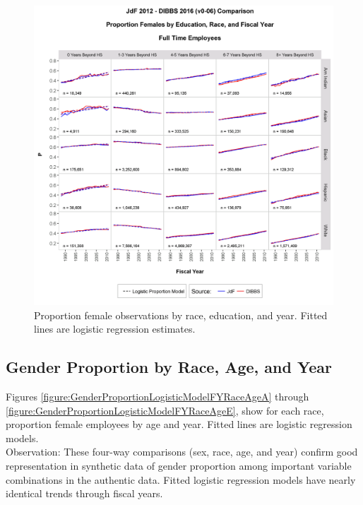 \documentclass[10pt, letterpaper]{article}
\begin{document}
\begin{spacing}{1.0}
\begin{figure}[h]
    \centering
    \includegraphics[width=6.25in, trim={0 0 0 1in}, clip]{GenderProportionLogisticModelEducationRaceFYScaleFixedv0-06.png}
    \caption{Proportion female observations by race, education, and year.  Fitted lines are logistic regression estimates.}
    \label{figure:GenderProportionLogisticModelEducationRaceFYScaleFixedv0-06}
\end{figure}

\clearpage

\subsection{Gender Proportion by Race, Age, and Year}

Figures \ref{figure:GenderProportionLogisticModelFYRaceAgeA} through \ref{figure:GenderProportionLogisticModelFYRaceAgeE}, show for each race, proportion female employees by age and year.  Fitted lines are logistic regression models.\\

Observation:  These four-way comparisons (sex, race, age, and year) confirm good representation in synthetic data of gender proportion among important variable combinations in the authentic data.  Fitted logistic regression models have nearly identical trends through fiscal years.\\


\end{spacing}
\end{document}
